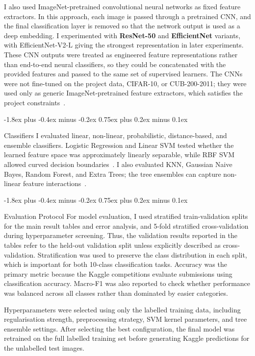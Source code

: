 \documentclass[11pt]{article}
\makeatletter
\renewcommand\subsection{%
    \@startsection{subsection}{2}{\z@}%
                  {-1.8ex plus -0.4ex minus -0.2ex}%
                  {0.75ex plus 0.2ex minus 0.1ex}%
                  {\normalsize\bf\raggedright}}
\makeatother
\begin{document}
I also used ImageNet-pretrained convolutional neural networks as fixed feature extractors. 
In this approach, each image is passed through a pretrained CNN, and the final classification layer 
is removed so that the network output is used as a deep embedding. 
I experimented with \textbf{ResNet-50} and \textbf{EfficientNet} variants, with EfficientNet-V2-L giving the strongest representation in later experiments. 
These CNN outputs were treated as engineered feature representations rather than
end-to-end neural classifiers, so they could be concatenated with the provided
features and passed to the same set of supervised learners.
The CNNs were not fine-tuned on the project data, CIFAR-10, or CUB-200-2011; 
they were used only as generic ImageNet-pretrained feature extractors, which satisfies the project constraints~\cite{deng2009imagenet,tan2021efficientnetv2}.


\subsection{Classifiers}
I evaluated linear, non-linear, probabilistic, distance-based, and ensemble
classifiers. Logistic Regression and Linear SVM tested whether the learned feature
space was approximately linearly separable, while RBF SVM allowed curved decision
boundaries~\cite{cortes1995support}. I also evaluated KNN, Gaussian Naive Bayes,
Random Forest, and Extra Trees; the tree ensembles can capture non-linear feature
interactions~\cite{breiman2001random,geurts2006extremely}.

\subsection{Evaluation Protocol}
For model evaluation, I used stratified train-validation splits for the main result tables 
and error analysis, and 5-fold stratified cross-validation during hyperparameter screening. 
Thus, the validation results reported in the tables refer to the held-out validation split 
unless explicitly described as cross-validation. Stratification was used to preserve the 
class distribution in each split, which is important for both 10-class classification tasks. 
Accuracy was the primary metric because the Kaggle competitions evaluate submissions using classification accuracy. 
Macro-F1 was also reported to check whether performance was balanced across all classes rather than dominated by easier categories.

Hyperparameters were selected using only the labelled training data, including
regularisation strength, preprocessing strategy, SVM kernel parameters, and tree
ensemble settings.
After selecting the best configuration, the final model was retrained on the full labelled training set before generating Kaggle predictions for the unlabelled test images.
\end{document}
